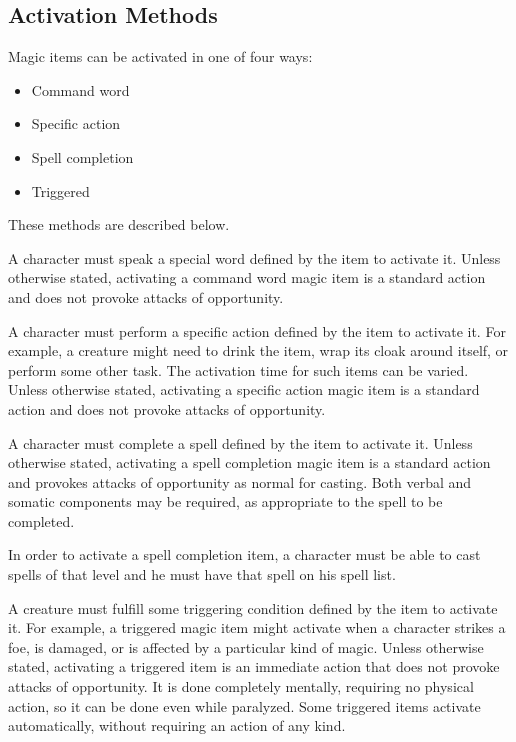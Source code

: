 \subsection{Activation Methods}
Magic items can be activated in one of four ways:

\begin{itemize}
  \item Command word
  \item Specific action
  \item Spell completion
  \item Triggered
\end{itemize}

These methods are described below.

 A character must speak a special word defined by the item to activate it. Unless otherwise stated, activating a command word magic item is a standard action and does not provoke attacks of opportunity.

 A character must perform a specific action defined by the item to activate it. For example, a creature might need to drink the item, wrap its cloak around itself, or perform some other task. The activation time for such items can be varied. Unless otherwise stated, activating a specific action magic item is a standard action and does not provoke attacks of opportunity.

 A character must complete a spell defined by the item to activate it. Unless otherwise stated, activating a spell completion magic item is a standard action and provokes attacks of opportunity as normal for casting. Both verbal and somatic components may be required, as appropriate to the spell to be completed.

In order to activate a spell completion item, a character must be able to cast spells of that level and he must have that spell on his spell list.

 A creature must fulfill some triggering condition defined by the item to activate it. For example, a triggered magic item might activate when a character strikes a foe, is damaged, or is affected by a particular kind of magic. Unless otherwise stated, activating a triggered item is an immediate action that does not provoke attacks of opportunity. It is done completely mentally, requiring no physical action, so it can be done even while paralyzed. Some triggered items activate automatically, without requiring an action of any kind.

